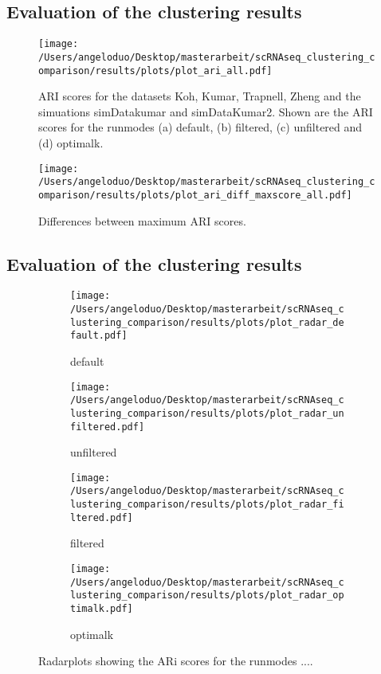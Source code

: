 \documentclass[11pt, a4paper]{article}\usepackage[]{graphicx}\usepackage[]{color}
\begin{document}
\subsection{Evaluation of the clustering results}
\begin{figure}[!h]
\texttt{[image: /Users/angeloduo/Desktop/masterarbeit/scRNAseq\_clustering\_comparison/results/plots/plot\_ari\_all.pdf]}
\caption{ARI scores for the datasets Koh, Kumar, Trapnell, Zheng and the simuations simDatakumar and simDataKumar2. Shown are the ARI scores for the runmodes (a) default, (b) filtered, (c) unfiltered and (d) optimalk. }
\label{fig:ariall}
\end{figure}


\begin{figure}[!h]
\texttt{[image: /Users/angeloduo/Desktop/masterarbeit/scRNAseq\_clustering\_comparison/results/plots/plot\_ari\_diff\_maxscore\_all.pdf]}
\caption{Differences between maximum ARI scores.  }
\label{fig:aridiff1}
\end{figure}


\subsection{Evaluation of the clustering results}


\begin{figure}
\centering
\begin{subfigure}{.5\textwidth}
  \centering
  \texttt{[image: /Users/angeloduo/Desktop/masterarbeit/scRNAseq\_clustering\_comparison/results/plots/plot\_radar\_default.pdf]}
  \caption{default}
  \label{fig:radd}
\end{subfigure}%
\begin{subfigure}{.5\textwidth}
  \centering
  \texttt{[image: /Users/angeloduo/Desktop/masterarbeit/scRNAseq\_clustering\_comparison/results/plots/plot\_radar\_unfiltered.pdf]}
  \caption{unfiltered}
  \label{fig:radu}
\end{subfigure}
\begin{subfigure}{.5\textwidth}
  \centering
  \texttt{[image: /Users/angeloduo/Desktop/masterarbeit/scRNAseq\_clustering\_comparison/results/plots/plot\_radar\_filtered.pdf]}
  \caption{filtered}
  \label{fig:radf}
\end{subfigure}%
\begin{subfigure}{.5\textwidth}
  \centering
  \texttt{[image: /Users/angeloduo/Desktop/masterarbeit/scRNAseq\_clustering\_comparison/results/plots/plot\_radar\_optimalk.pdf]}
  \caption{optimalk}
  \label{fig:rado}
\end{subfigure}
\caption{Radarplots showing the ARi scores for the runmodes .... }
\label{fig:radar}
\end{figure}
\end{document}
